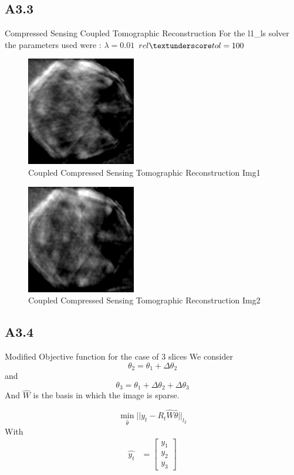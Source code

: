\documentclass{article}
\newcommand{\lone}[1]{
  ||#1||_{l_1}
}
\newcommand{\ltwo}[1]{
  ||#1||_{l_2}
}
\begin{document}
\subsection*{A3.3}
Compressed Sensing Coupled Tomographic Reconstruction
For the l1\_ls solver the parameters used were :
$\lambda = 0.01$
$rel\textunderscore tol = 100$
\begin{figure}[H]
  \centering
  \includegraphics[scale=0.5]{images/cs_coupled_1}
  \caption{Coupled Compressed Sensing Tomographic Reconstruction Img1}
  \label{fig:3}
\end{figure}
\begin{figure}[H]
  \centering
  \includegraphics[scale=0.5]{images/cs_coupled_2}
  \caption{Coupled Compressed Sensing Tomographic Reconstruction Img2}
  \label{fig:4}
\end{figure}
\subsection*{A3.4}
Modified Objective function for the case of 3 slices
We consider $$\theta_2 = \theta_1 + \Delta\theta_2$$ and $$\theta_3 = \theta_1 + \Delta \theta_2 + \Delta \theta_3$$
And $\hat{W}$ is the basis in which the image is sparse.

\begin{equation}
  \label{eq:2}
  \min_{\hat{\theta}} \ltwo{y_t - R_t \hat{W} \hat{\theta}}
\end{equation}
With
\begin{align}
  \label{eq:3}
  \hat{y_t} &=
              \begin{bmatrix}
                y_1\\
                y_2\\
                y_3
              \end{bmatrix}
\end{align}
\end{document}

